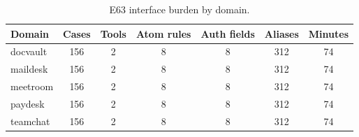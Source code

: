 \begin{table}[t]
\centering
\small
\caption{E63 interface burden by domain.}
\label{tab:e63-burden}
\begin{tabular}{lcccccc}
\toprule
Domain & Cases & Tools & Atom rules & Auth fields & Aliases & Minutes \\
\midrule
docvault & 156 & 2 & 8 & 8 & 312 & 74 \\
maildesk & 156 & 2 & 8 & 8 & 312 & 74 \\
meetroom & 156 & 2 & 8 & 8 & 312 & 74 \\
paydesk & 156 & 2 & 8 & 8 & 312 & 74 \\
teamchat & 156 & 2 & 8 & 8 & 312 & 74 \\
\bottomrule
\end{tabular}
\end{table}
